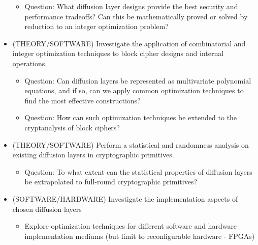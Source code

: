 \documentclass[11pt]{article}
\begin{document}
\begin{itemize}
\begin{itemize}
		\item Question: What diffusion layer designs provide the best security and performance tradeoffs? Can this be mathematically proved or solved by reduction to an integer optimization problem?
	\end{itemize}
	\item (THEORY/SOFTWARE) Investigate the application of combinatorial and integer optimization techniques to block cipher designs and internal operations.
	\begin{itemize}
		\item Question: Can diffusion layers be represented as multivariate polynomial equations, and if so,  can we apply common optimization techniques to find the most effective constructions?
		\item Question: How can such optimization techniques be extended to the cryptanalysis of block ciphers?
	\end{itemize}
	\item (THEORY/SOFTWARE) Perform a statistical and randomness analysis on existing diffusion layers in cryptographic primitives.
	\begin{itemize}
		\item Question: To what extent can the statistical properties of diffusion layers be extrapolated to full-round cryptographic primitives?
	\end{itemize}
	\item (SOFTWARE/HARDWARE) Investigate the implementation aspects of chosen diffusion layers
	\begin{itemize}
		\item Explore optimization techniques for different software and hardware implementation mediums (but limit to reconfigurable hardware - FPGAs) \cite{CryptoEngineering} \cite{henriquez2006cryptographic}
	\end{itemize}
\end{itemize}

{}

\end{document}
